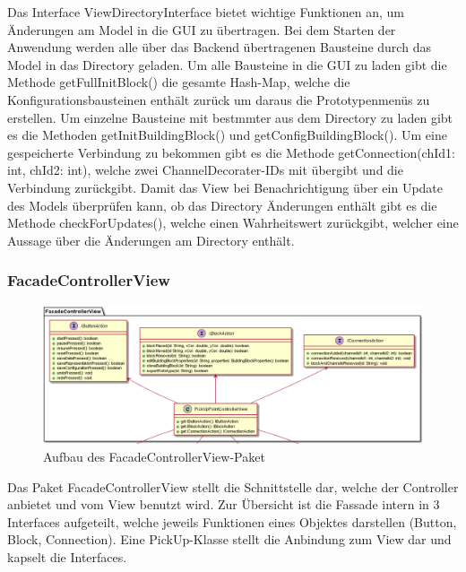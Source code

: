 \documentclass[parskip=full]{scrartcl}
\begin{document}
Das Interface ViewDirectoryInterface bietet wichtige Funktionen an, um Änderungen am Model in die GUI zu übertragen. 
Bei dem Starten der Anwendung werden alle über das Backend übertragenen Bausteine durch das Model in das Directory geladen. Um alle Bausteine in die GUI zu laden gibt die Methode getFullInitBlock() die gesamte Hash-Map, welche die Konfigurationsbausteinen enthält zurück um daraus die Prototypenmenüs zu erstellen. Um einzelne Bausteine mit bestmmter aus dem Directory zu laden gibt es die Methoden getInitBuildingBlock() und getConfigBuildingBlock(). Um eine gespeicherte Verbindung zu bekommen gibt es die Methode getConnection(chId1: int, chId2: int), welche zwei ChannelDecorater-IDs mit übergibt und die Verbindung zurückgibt.
Damit das View bei Benachrichtigung über ein Update des Models überprüfen kann, ob das Directory Änderungen enthält gibt es die Methode checkForUpdates(), welche einen Wahrheitswert zurückgibt, welcher eine Aussage über die Änderungen am Directory enthält.

\clearpage

\subsubsection{FacadeControllerView}

\begin{figure}[htbp]
	\begin{center}
		\includegraphics[width = 14 cm]{Grafiken/View/FacadeControllerViewNamespace.PNG}
		\caption{Aufbau des FacadeControllerView-Paket}
		\label{Entwurf_Grob}
	\end{center}
\end{figure}

Das Paket FacadeControllerView stellt die Schnittstelle dar, welche der Controller anbietet und vom View benutzt wird. Zur Übersicht ist die Fassade intern in 3 Interfaces aufgeteilt, welche jeweils Funktionen eines Objektes darstellen (Button, Block, Connection). Eine PickUp-Klasse stellt die Anbindung zum View dar und kapselt die Interfaces.
\end{document}

